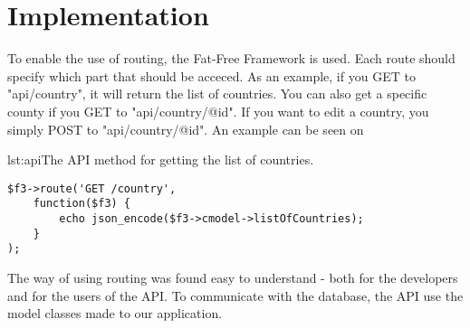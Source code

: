 \section{Implementation}
To enable the use of routing, the Fat-Free Framework is used. 
Each route should specify which part that should be acceced. As an example, if you GET to "api/country", it will return the list of countries. You can also get a specific county if you GET to "api/country/@id". If you want to edit a country, you simply POST to "api/country/@id".
An example can be seen on 
\begin{code}{lst:api}{The API method for getting the list of countries.}
\begin{lstlisting}
$f3->route('GET /country',
    function($f3) {
        echo json_encode($f3->cmodel->listOfCountries);
    }
);
\end{lstlisting}
\end{code}

The way of using routing was found easy to understand - both for the developers and for the users of the API. 
To communicate with the database, the API use the model classes made to our application.